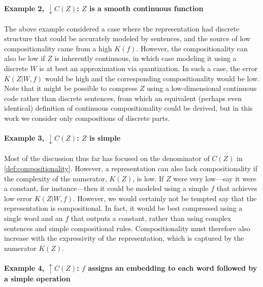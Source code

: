 \documentclass{article}
\begin{document}
\begin{appendices}
\paragraph{Example 2, $\downarrow C(Z)$: $Z$ is a smooth continuous function}

The above example considered a case where the representation had discrete structure that could be accurately modeled by sentences, and the source of low compositionality came from a high $K(f)$. However, the compositionality can also be low if $Z$ is inherently continuous, in which case modeling it using a discrete $W$ is at best an approximation via quantization. In such a case, the error $K(Z|W,f)$ would be high and the corresponding compositionality would be low. Note that it might be possible to compress $Z$ using a low-dimensional continuous code rather than discrete sentences, from which an equivalent (perhaps even identical) definition of continuous compositionality could be derived, but in this work we consider only compositions of discrete parts.

\paragraph{Example 3, $\downarrow C(Z)$: $Z$ is simple}

Most of the discussion thus far has focused on the denominator of $C(Z)$ in \cref{def:compositionality}. However, a representation can also lack compositionality if the complexity of the numerator, $K(Z)$, is low. If $Z$ were very low---say it were a constant, for instance---then it could be modeled using a simple $f$ that achieves low error $K(Z|W,f)$. However, we would certainly not be tempted say that the representation is compositional. In fact, it would be best compressed using a single word and an $f$ that outputs a constant, rather than using complex sentences and simple compositional rules. Compositionality must therefore also increase with the expressivity of the representation, which is captured by the numerator $K(Z)$.

\paragraph{Example 4, $\uparrow C(Z)$: $f$ assigns an embedding to each word followed by a simple operation}


\end{appendices}
\end{document}
